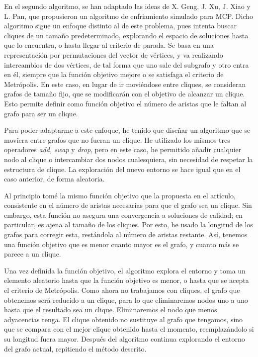 En el segundo algoritmo, se han adaptado las ideas de X. Geng, J. Xu, J. Xiao y L. Pan,
que propusieron un algoritmo de enfriamiento simulado para MCP. Dicho algoritmo sigue
un enfoque distinto al de este problema, pues intenta buscar cliques de un tamaño
predeterminado, explorando el espacio de soluciones hasta que lo encuentra, o hasta
llegar al criterio de parada. Se basa en una representación por permutaciones del
vector de vértices, y va realizando intercambios de dos vértices, de tal forma que
uno sale del subgrafo y otro entra en él, siempre que la función objetivo mejore o
se satisfaga el criterio de Metrópolis. En este caso, en lugar de ir moviéndose entre
cliques, se consideran grafos de tamaño fijo, que se modificarán con el objetivo de
alcanzar un clique. Esto permite definir como función objetivo el número de aristas
que le faltan al grafo para ser un clique.

Para poder adaptarme a este enfoque, he tenido que diseñar un algoritmo que se moviera
entre grafos que no fueran un clique. He utilizado los mismos tres operadores \textit{add, swap}
y \textit{drop}, pero en este caso, he permitido añadir cualquier nodo al clique o
intercambiar dos nodos cualesquiera, sin necesidad de respetar la estructura de clique.
La exploración del nuevo entorno se hace igual que en el caso anterior, de forma aleatoria.

Al principio tomé la mismo función objetivo que la propuesta en el artículo, consistente
en el número de aristas necesarias para que el grafo sea un clique. Sin embargo, esta
función no asegura una convergencia a soluciones de calidad; en particular, es ajena al
tamaño de los cliques. Por esto, he usado la longitud de los grafos para corregir esta,
restándola al número de aristas restante. Así, tenemos una función objetivo que es menor
cuanto mayor es el grafo, y cuanto más se parece a un clique.

Una vez definida la función objetivo, el algoritmo explora el entorno y toma un elemento
aleatorio hasta que la función objetivo es menor, o hasta que se acepta el criterio de
Metrópolis. Como ahora no trabajamos con cliques, el grafo que obtenemos será reducido
a un clique, para lo que eliminaremos nodos uno a uno hasta que el resultado sea un clique.
Eliminaremos el nodo que menos adyacencias tenga. El clique obtenido no sustituye al grafo
que tengamos, sino que se compara con el mejor clique obtenido hasta el momento, reemplazándolo
si su longitud fuera mayor. Después del algoritmo continua explorando el entorno del
grafo actual, repitiendo el método descrito.

